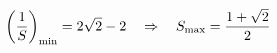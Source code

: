 \documentclass[preview]{standalone}
\begin{document}
\begin{align*}
\special{dvisvgm:raw <g id='unique000'>}\left(\frac1S\right)_{\min}=2\sqrt2-2\quad\Rightarrow\quad S_{\max}=\frac{1+\sqrt2}{2}\special{dvisvgm:raw </g>}
\end{align*}
\end{document}
